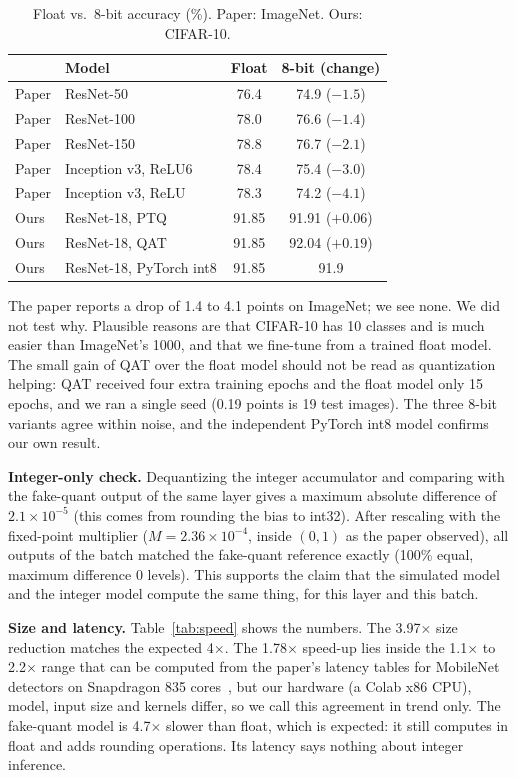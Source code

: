 \documentclass[conference]{IEEEtran}
\begin{document}
\begin{table}[t]
\caption{Float vs.\ 8-bit accuracy (\%). Paper: ImageNet. Ours: CIFAR-10.}
\label{tab:main}
\centering\footnotesize
\begin{tabular}{@{}llcc@{}}
\toprule
 & Model & Float & 8-bit (change) \\
\midrule
Paper & ResNet-50  & 76.4 & 74.9 ($-1.5$)\\
Paper & ResNet-100 & 78.0 & 76.6 ($-1.4$)\\
Paper & ResNet-150 & 78.8 & 76.7 ($-2.1$)\\
Paper & Inception v3, ReLU6 & 78.4 & 75.4 ($-3.0$)\\
Paper & Inception v3, ReLU  & 78.3 & 74.2 ($-4.1$)\\
\midrule
Ours & ResNet-18, PTQ & 91.85 & 91.91 ($+0.06$)\\
Ours & ResNet-18, QAT & 91.85 & 92.04 ($+0.19$)\\
Ours & ResNet-18, PyTorch int8 & 91.85 & 91.9\\
\bottomrule
\end{tabular}
\end{table}

The paper reports a drop of 1.4 to 4.1 points on ImageNet; we see none. We did not test why. Plausible reasons are that CIFAR-10 has 10 classes and is much easier than ImageNet's 1000, and that we fine-tune from a trained float model. The small gain of QAT over the float model should not be read as quantization helping: QAT received four extra training epochs and the float model only 15 epochs, and we ran a single seed (0.19 points is 19 test images). The three 8-bit variants agree within noise, and the independent PyTorch int8 model confirms our own result.

\textbf{Integer-only check.} Dequantizing the integer accumulator and comparing with the fake-quant output of the same layer gives a maximum absolute difference of $2.1\times10^{-5}$ (this comes from rounding the bias to int32). After rescaling with the fixed-point multiplier ($M=2.36\times10^{-4}$, inside $(0,1)$ as the paper observed), all outputs of the batch matched the fake-quant reference exactly (100\% equal, maximum difference 0 levels). This supports the claim that the simulated model and the integer model compute the same thing, for this layer and this batch.

\textbf{Size and latency.} Table~\ref{tab:speed} shows the numbers. The 3.97$\times$ size reduction matches the expected 4$\times$. The 1.78$\times$ speed-up lies inside the 1.1$\times$ to 2.2$\times$ range that can be computed from the paper's latency tables for MobileNet detectors on Snapdragon 835 cores~\cite{jacob2018}, but our hardware (a Colab x86 CPU), model, input size and kernels differ, so we call this agreement in trend only. The fake-quant model is 4.7$\times$ slower than float, which is expected: it still computes in float and adds rounding operations. Its latency says nothing about integer inference.
\end{document}
